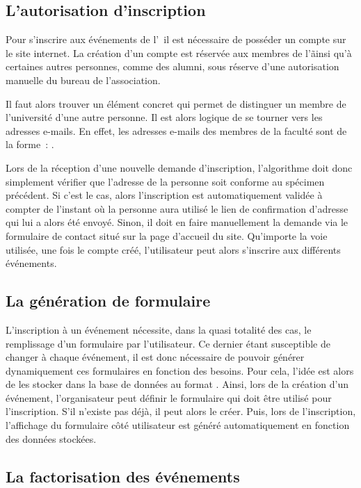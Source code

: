 \subsection{L'autorisation d'inscription}
\label{subsec:autorisation-inscription}

Pour s'inscrire aux événements de l'\ofni\, il est nécessaire de posséder un compte sur le site internet. La création d'un compte est réservée aux membres de l'\univ\~ ainsi qu'à certaines autres personnes, comme des alumni, sous réserve d'une autorisation manuelle du bureau de l'association.

Il faut alors trouver un élément concret qui permet de distinguer un membre de l'université d'une autre personne. Il est alors logique de se tourner vers les adresses e-mails. En effet, les adresses e-mails des membres de la faculté sont de la forme~: .

Lors de la réception d'une nouvelle demande d'inscription, l'algorithme doit donc simplement vérifier que l'adresse  de la personne soit conforme au spécimen précédent. Si c'est le cas, alors l'inscription est automatiquement validée à compter de l'instant où la personne aura utilisé le lien de confirmation d'adresse qui lui a alors été envoyé. Sinon, il doit en faire manuellement la demande via le formulaire de contact situé sur la page d'accueil du site. Qu'importe la voie utilisée, une fois le compte créé, l'utilisateur peut alors s'inscrire aux différents événements.

\subsection{La génération de formulaire}
\label{subsec:generation-formulaire}

L'inscription à un événement nécessite, dans la quasi totalité des cas, le remplissage d'un formulaire par l'utilisateur. Ce dernier étant susceptible de changer à chaque événement, il est donc nécessaire de pouvoir générer dynamiquement ces formulaires en fonction des besoins. Pour cela, l'idée est alors de les stocker dans la base de données au format . Ainsi, lors de la création d'un événement, l'organisateur peut définir le formulaire qui doit être utilisé pour l'inscription. S'il n'existe pas déjà, il peut alors le créer. Puis, lors de l'inscription, l'affichage du formulaire côté utilisateur est généré automatiquement en fonction des données stockées.

\subsection{La factorisation des événements}
\label{subsec:factorisation-evenements}

